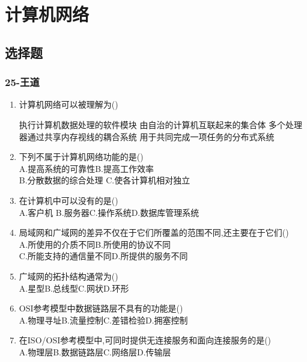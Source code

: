 \documentclass[12pt, a4paper, oneside, UTF8]{ctexbook}
\begin{document}
% 
\else
\fi
\chapter{计算机网络}
\section{选择题}

\subsection{25-王道}
\begin{enumerate}
    \item 计算机网络可以被理解为() 
    \begin{choices}[1]
    \task 执行计算机数据处理的软件模块 
    \task 由自治的计算机互联起来的集合体 
    \task 多个处理器通过共享内存视线的耦合系统 
    \task 用于共同完成一项任务的分布式系统 
    \end{choices}

    \item 下列不属于计算机网络功能的是() \\
    A.提高系统的可靠性\qquad B.提高工作效率 \\
    B.分散数据的综合处理 \qquad C.使各计算机相对独立 


    \item 在计算机中可以没有的是() \\
    A.客户机 \qquad B.服务器\qquad C.操作系统\qquad D.数据库管理系统 


    \item 局域网和广域网的差异不仅在于它们所覆盖的范围不同,还主要在于它们() \\
    A.所使用的介质不同\qquad B.所使用的协议不同 \\
    C.所能支持的通信量不同\qquad D.所提供的服务不同

    \item 广域网的拓扑结构通常为() \\
    A.星型\qquad B.总线型\qquad C.网状\qquad D.环形


    \item \bl OSI参考模型中数据链路层不具有的功能是() \\
    A.物理寻址\qquad B.流量控制\qquad C.差错检验\qquad D.拥塞控制



    \item \bl 在ISO/OSI参考模型中,可同时提供无连接服务和面向连接服务的是() \\
    A.物理层\qquad B.数据链路层\qquad C.网络层\qquad D.传输层
    

\end{enumerate}
\end{document}
